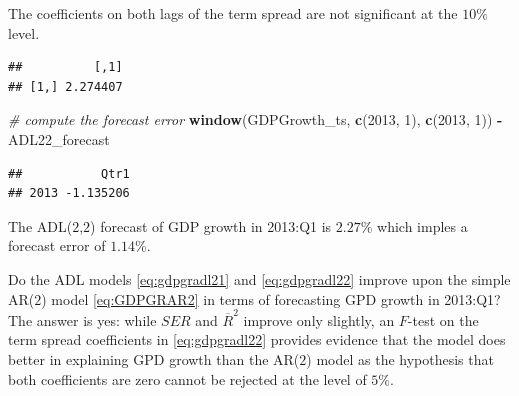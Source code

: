 \documentclass[]{book}
\newenvironment{Shaded}{\begin{snugshade}}{\end{snugshade}}
\newcommand{\KeywordTok}[1]{\textcolor[rgb]{0.13,0.29,0.53}{\textbf{#1}}}
\newcommand{\DecValTok}[1]{\textcolor[rgb]{0.00,0.00,0.81}{#1}}
\newcommand{\StringTok}[1]{\textcolor[rgb]{0.31,0.60,0.02}{#1}}
\newcommand{\CommentTok}[1]{\textcolor[rgb]{0.56,0.35,0.01}{\textit{#1}}}
\newcommand{\OperatorTok}[1]{\textcolor[rgb]{0.81,0.36,0.00}{\textbf{#1}}}
\newcommand{\NormalTok}[1]{#1}
\theoremstyle{definition}
\theoremstyle{definition}
\theoremstyle{definition}
\theoremstyle{remark}
\begin{document}
The coefficients on both lags of the term spread are not significant at
the \(10\%\) level.

\begin{Shaded}
\end{Shaded}

\begin{verbatim}
##          [,1]
## [1,] 2.274407
\end{verbatim}

\begin{Shaded}
\begin{Highlighting}[]
\CommentTok{# compute the forecast error}
\KeywordTok{window}\NormalTok{(GDPGrowth_ts, }\KeywordTok{c}\NormalTok{(}\DecValTok{2013}\NormalTok{, }\DecValTok{1}\NormalTok{), }\KeywordTok{c}\NormalTok{(}\DecValTok{2013}\NormalTok{, }\DecValTok{1}\NormalTok{)) }\OperatorTok{-}\StringTok{ }\NormalTok{ADL22_forecast}
\end{Highlighting}
\end{Shaded}

\begin{verbatim}
##           Qtr1
## 2013 -1.135206
\end{verbatim}

The ADL(\(2\),\(2\)) forecast of GDP growth in 2013:Q1 is \(2.27\%\)
which imples a forecast error of \(1.14\%\).

Do the ADL models \eqref{eq:gdpgradl21} and \eqref{eq:gdpgradl22} improve
upon the simple AR(\(2\)) model \eqref{eq:GDPGRAR2} in terms of
forecasting GPD growth in 2013:Q1? The answer is yes: while \(SER\) and
\(\overline{R}^2\) improve only slightly, an \(F\)-test on the term
spread coefficients in \eqref{eq:gdpgradl22} provides evidence that the
model does better in explaining GPD growth than the AR(\(2\)) model as
the hypothesis that both coefficients are zero cannot be rejected at the
level of \(5\%\).

\begin{Shaded}
\end{Shaded}
\end{document}
